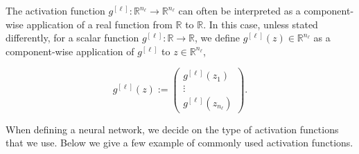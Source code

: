 \begin{remark}
The activation function $g^{[\ell]}: \mathbb{R}^{n_{\ell}} \rightarrow \mathbb{R}^{n_{\ell}}$ can often be interpreted as a component-wise application of a real function from $\mathbb{R}$ to $\mathbb{R}$. In this case, unless stated differently, for a scalar function $g^{[\ell]}: \mathbb{R} \rightarrow \mathbb{R}$, we define $g^{[\ell]}(z) \in \mathbb{R}^{n_{\ell}}$ as a component-wise application of $g^{[\ell]}$ to $z \in \mathbb{R}^{n_{\ell}}$,

\begin{equation}
    g^{[\ell]}(z) := \begin{pmatrix}
    g^{[\ell]}(z_1) \\
    \vdots \\
    g^{[\ell]}(z_{n_\ell})
    \end{pmatrix}.
    \label{eqn:32}
\end{equation}

\end{remark}

When defining a neural network, we decide on the type of activation functions that we use.
Below we give a few example of commonly used activation functions.

